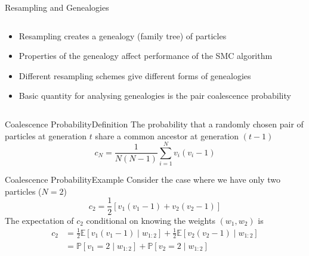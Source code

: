 \documentclass[aspectratio=169]{beamer}
\theoremstyle{definition}
\newcommand{\PR}{\mathbb{P}}
\newcommand{\E}{\mathbb{E}}
\newcommand{\vt}[1]{v_{#1}}
\newcommand{\wt}[1]{w_{#1}}
\begin{document}
\begin{frame}{Resampling and Genealogies}
\begin{columns}
\begin{column}{0.45\textwidth}
\begin{itemize}
\item Resampling creates a genealogy (family tree) of particles
\item Properties of the genealogy affect performance of the SMC algorithm
\item Different resampling schemes give different forms of genealogies
\item Basic quantity for analysing genealogies is the pair coalescence probability
\end{itemize}
\end{column}
\begin{column}{0.45\textwidth}
\end{column}
\end{columns}
\end{frame}


\begin{frame}{Coalescence Probability}{Definition}
The probability that a randomly chosen pair of particles at generation $t$ share a common ancestor at generation $(t-1)$
\begin{equation*}
c_N = \frac{1}{N(N-1)} \sum_{i=1}^N \vt{i}(\vt{i}-1)
\end{equation*}

\end{frame}


\begin{frame}{Coalescence Probability}{Example}
Consider the case where we have only two particles ($N=2$)
\begin{equation*}
c_2 = \frac{1}{2}\left[ \vt{1}(\vt{1}-1) + \vt{2}(\vt{2}-1)\right]
\end{equation*}
The expectation of $c_2$ conditional on knowing the weights $(\wt{1}, \wt{2})$ is
\begin{align*}
c_2 &= \frac{1}{2} \E[\vt{1}(\vt{1}-1) \mid \wt{1:2}] + \frac{1}{2} \E[\vt{2}(\vt{2}-1) \mid \wt{1:2}] \\
&= \PR[\vt{1}=2 \mid \wt{1:2}] + \PR[\vt{2}=2 \mid \wt{1:2}]
\end{align*}

%
\end{frame}
\end{document}
